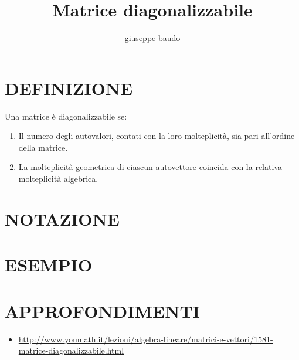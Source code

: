 \documentclass[a4paper,10pt]{article}
\title{Matrice diagonalizzabile}
\author{\href{http://www.baudo.hol.es}{giuseppe baudo}}
\begin{document}
\maketitle

\section{DEFINIZIONE}
Una matrice è diagonalizzabile se:
\begin{enumerate}
 \item Il numero degli autovalori, contati con la loro molteplicità, sia pari all'ordine della matrice.
 \item La molteplicità geometrica di ciascun autovettore coincida con la relativa molteplicità algebrica.
\end{enumerate}


\section{NOTAZIONE}

\section{ESEMPIO}

\section{APPROFONDIMENTI}
\begin{itemize}
 \item \url{http://www.youmath.it/lezioni/algebra-lineare/matrici-e-vettori/1581-matrice-diagonalizzabile.html}
\end{itemize}
\end{document}
